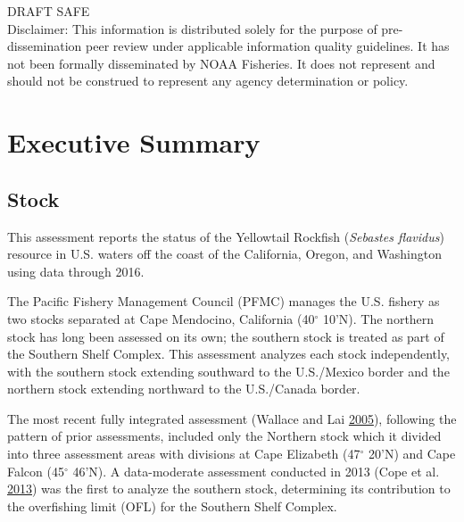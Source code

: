 \documentclass[12pt,]{article}
\begin{document}
\begin{center}
\vfill
DRAFT SAFE\\
Disclaimer: This information is distributed solely for the purpose of pre-dissemination
peer review under applicable information quality guidelines. It has not been formally
disseminated by NOAA Fisheries. It does not represent and should not be construed to
represent any agency determination or policy. 

\vspace{.3cm}

\maketitle

\setcounter{page}{1}
\end{center}

{
\setcounter{tocdepth}{4}
\tableofcontents
}
\setlength{\parskip}{5mm plus1mm minus1mm} \pagebreak

 \setcounter{page}{1}
\renewcommand{\thefigure}{\alph{figure}}
\renewcommand{\thetable}{\alph{table}}

\section*{Executive Summary}\label{executive-summary}

\subsection*{Stock}\label{stock}

This assessment reports the status of the Yellowtail Rockfish
(\emph{Sebastes flavidus}) resource in U.S. waters off the coast of the
California, Oregon, and Washington using data through 2016.

The Pacific Fishery Management Council (PFMC) manages the U.S. fishery
as two stocks separated at Cape Mendocino, California (40\(^\circ\)
10'N). The northern stock has long been assessed on its own; the
southern stock is treated as part of the Southern Shelf Complex. This
assessment analyzes each stock independently, with the southern stock
extending southward to the U.S./Mexico border and the northern stock
extending northward to the U.S./Canada border.

The most recent fully integrated assessment (Wallace and Lai
\protect\hyperlink{ref-Wallace2005}{2005}), following the pattern of
prior assessments, included only the Northern stock which it divided
into three assessment areas with divisions at Cape Elizabeth
(47\(^\circ\) 20'N) and Cape Falcon (45\(^\circ\) 46'N). A data-moderate
assessment conducted in 2013 (Cope et al.
\protect\hyperlink{ref-Cope2013}{2013}) was the first to analyze the
southern stock, determining its contribution to the overfishing limit
(OFL) for the Southern Shelf Complex.
\end{document}
